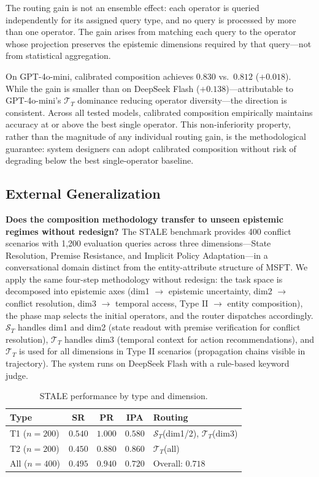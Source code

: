 \documentclass[letterpaper,twocolumn,10pt]{article}
\begin{document}
The routing gain is not an ensemble effect: each operator is queried independently for its assigned query type, and no query is processed by more than one operator. The gain arises from matching each query to the operator whose projection preserves the epistemic dimensions required by that query---not from statistical aggregation.

On GPT-4o-mini, calibrated composition achieves $0.830$ vs.\ $0.812$ ($+0.018$). While the gain is smaller than on DeepSeek Flash ($+0.138$)---attributable to GPT-4o-mini's $\mathcal{T}_T$ dominance reducing operator diversity---the direction is consistent. Across all tested models, calibrated composition empirically maintains accuracy at or above the best single operator. This non-inferiority property, rather than the magnitude of any individual routing gain, is the methodological guarantee: system designers can adopt calibrated composition without risk of degrading below the best single-operator baseline.

\subsection{External Generalization}
\label{sec:stale}
\textbf{Does the composition methodology transfer to unseen epistemic regimes without redesign?} The STALE benchmark \cite{chao2026stale} provides 400 conflict scenarios with 1,200 evaluation queries across three dimensions---State Resolution, Premise Resistance, and Implicit Policy Adaptation---in a conversational domain distinct from the entity-attribute structure of MSFT. We apply the same four-step methodology without redesign: the task space is decomposed into epistemic axes (dim1 $\rightarrow$ epistemic uncertainty, dim2 $\rightarrow$ conflict resolution, dim3 $\rightarrow$ temporal access, Type II $\rightarrow$ entity composition), the phase map selects the initial operators, and the router dispatches accordingly. $\mathcal{S}_T$ handles dim1 and dim2 (state readout with premise verification for conflict resolution), $\mathcal{T}_T$ handles dim3 (temporal context for action recommendations), and $\mathcal{T}_T$ is used for all dimensions in Type II scenarios (propagation chains visible in trajectory). The system runs on DeepSeek Flash with a rule-based keyword judge.

\begin{table}[t]
\centering\small
\caption{STALE performance by type and dimension.}
\begin{tabular}{lcccl}
\toprule
Type & SR & PR & IPA & Routing \\
\midrule
T1 ($n=200$) & $0.540$ & $1.000$ & $0.580$ & $\mathcal{S}_T$(dim1/2), $\mathcal{T}_T$(dim3) \\
T2 ($n=200$) & $0.450$ & $0.880$ & $0.860$ & $\mathcal{T}_T$(all) \\
\addlinespace
All ($n=400$) & $0.495$ & $0.940$ & $0.720$ & Overall: $0.718$ \\
\bottomrule
\end{tabular}
\end{table}
\end{document}
